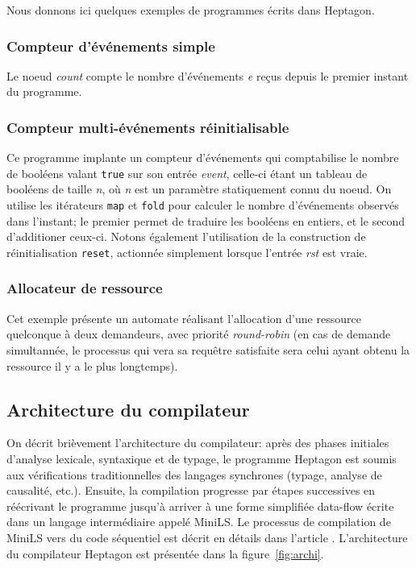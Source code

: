 \documentclass[a4paper]{article}
\newcommand{\LANG}{{\sc Heptagon}}
\newcommand{\minils}{{\sc MiniLS}}
\begin{document}
Nous donnons ici quelques exemples de programmes \'ecrits dans \LANG.

\subsubsection{Compteur d'\'ev\'enements simple}



Le noeud \textit{count} compte le nombre d'\'ev\'enements \textit{e} re\c{c}us depuis le
premier instant du programme.

\subsubsection{Compteur multi-\'ev\'enements r\'einitialisable}



Ce programme implante un compteur d'\'ev\'enements qui comptabilise le
nombre de bool\'eens valant \texttt{true} sur son entr\'ee
\textit{event}, celle-ci \'etant un tableau de bool\'eens de taille
\textit{n}, o\`u \textit{n} est un param\`etre statiquement connu du
noeud. On utilise les it\'erateurs \texttt{map} et \texttt{fold} pour
calculer le nombre d'\'ev\'enements observ\'es dans l'instant; le
premier permet de traduire les bool\'eens en entiers, et le second
d'additioner ceux-ci. Notons \'egalement l'utilisation de la
construction de r\'einitialisation \texttt{reset}, actionn\'ee
simplement lorsque l'entr\'ee \textit{rst} est vraie.

\subsubsection{Allocateur de ressource}



Cet exemple pr\'esente un automate r\'ealisant l'allocation d'une ressource
quelconque \`a deux demandeurs, avec priorit\'e \textit{round-robin} (en cas de
demande simultann\'ee, le processus qui vera sa requ\^etre satisfaite sera celui
ayant obtenu la ressource il y a le plus longtemps).

\subsection{Architecture du compilateur}

On d\'ecrit bri\`evement l'architecture du compilateur: apr\`es des
phases initiales d'analyse lexicale, syntaxique et de typage, le
programme \LANG{} est soumis aux v\'erifications traditionnelles des
langages synchrones (typage, analyse de causalit\'e, etc.). Ensuite, la compilation
progresse par \'etapes successives en r\'e\'ecrivant le programme jusqu'\`a
arriver \`a une forme simplifi\'ee data-flow \'ecrite dans un langage interm\'ediaire
appel\'e \minils. Le processus de compilation de \minils{}
vers du code s\'equentiel est d\'ecrit en d\'etails dans
l'article \cite{lucy:lctes08a}. L'architecture du compilateur \LANG{} est pr\'esent\'ee
dans la figure~\ref{fig:archi}.
\end{document}
